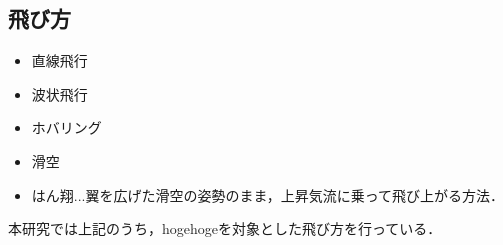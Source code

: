 
    \subsection{飛び方}
        \begin{itemize}
        \item 直線飛行
        \item 波状飛行
        \item ホバリング
        \item 滑空
        \item はん翔...翼を広げた滑空の姿勢のまま，上昇気流に乗って飛び上がる方法．
        \end{itemize}

        本研究では上記のうち，hogehogeを対象とした飛び方を行っている．
